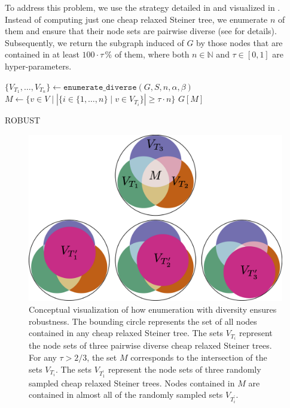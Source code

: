 \documentclass{bioinfo}
\begin{document}
To address this problem, we use the strategy detailed in  and visualized in . Instead of computing just one cheap relaxed Steiner tree, we enumerate $n$ of them and ensure that their node sets are pairwise diverse (see  for details). Subsequently, we return the subgraph induced of $G$ by those nodes that are contained in at least $100\cdot\tau$\,\% of them, where both $n\in\mathbb{N}$ and $\tau\in[0,1]$ are hyper-parameters.

\begin{algorithm}[h]
\SetAlgoLined
{}
$\{V_{T_1},\ldots,V_{T_n}\}\gets\mathtt{enumerate\_diverse}(G,S,n,\alpha,\beta)$\;
$M\gets\{v\in V\mid|\{i\in\{1,\ldots,n\}\mid v\in V_{T_i}\}|\geq\tau\cdot n\}$\;
\Return $G[M]$\;
\caption{ROBUST}
\label{alg:robust}
\end{algorithm}

\begin{figure}[htb]
\centering
\includegraphics[width=0.95\linewidth]{img/robust_enum.png}
\caption{Conceptual visualization of how enumeration with diversity ensures robustness. The bounding circle represents the set of all nodes contained in any cheap relaxed Steiner tree. The sets $V_{T_i}$ represent the node sets of three pairwise diverse cheap relaxed Steiner trees. For any $\tau>2/3$, the set $M$ corresponds to the intersection of the sets $V_{T_i}$. The sets $V_{T_1^\prime}$ represent the node sets of three randomly sampled cheap relaxed Steiner trees. Nodes contained in $M$ are contained in almost all of the randomly sampled sets $V_{T_i^\prime}$.}
\label{fig:consensus}
\end{figure}
\end{document}
